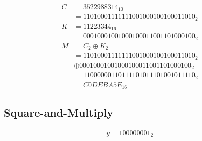 \documentclass{article}
\begin{document}
\subsubsection{}

\begin{align*}
	C & = 3522988314_{10}\\
	  & = 1101 0001 1111 1100 1000 1001 0001 1010_2\\
	K & = 11223344_{16}\\
	  & = 0001 0001 0010 0010 0011 0011 0100 0100_2\\
	M & = C_2 \oplus K_2\\
	  & = 1101 0001 1111 1100 1000 1001 0001 1010_2\\
	  & \oplus 0001 0001 0010 0010 0011 0011 0100 0100_2\\
	  & = 1100 0000 1101 1110 1011 1010 0101 1110_2\\
	  & = C0DEBA5E_{16}
\end{align*}

\subsection{Square-and-Multiply}

\begin{align*}
	y = 1000 0000 1_2
\end{align*}
\end{document}
